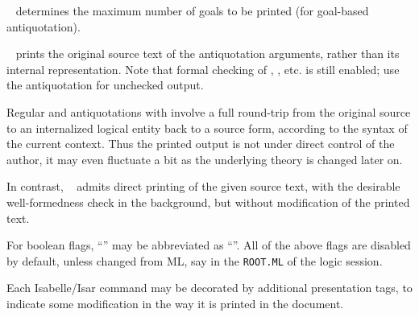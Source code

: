 \begin{isabellebody}
\begin{isamarkuptext}
\begin{description}
  \item {}\hypertarget{antiquotation option.goals-limit}{\hyperlink{antiquotation option.goals-limit}{\mbox{}}}~
  determines the maximum number of goals to be printed (for goal-based
  antiquotation).

  \item {}\hypertarget{antiquotation option.source}{\hyperlink{antiquotation option.source}{\mbox{}}}~ prints the
  original source text of the antiquotation arguments, rather than its
  internal representation.  Note that formal checking of
  \hyperlink{antiquotation.thm}{\mbox{}}, \hyperlink{antiquotation.term}{\mbox{}}, etc. is still
  enabled; use the \hyperlink{antiquotation.text}{\mbox{}} antiquotation for unchecked
  output.

  Regular  and  antiquotations with  involve a full round-trip from the original source
  to an internalized logical entity back to a source form, according
  to the syntax of the current context.  Thus the printed output is
  not under direct control of the author, it may even fluctuate a bit
  as the underlying theory is changed later on.

  In contrast, \hypertarget{antiquotation option.source}{\hyperlink{antiquotation option.source}{\mbox{}}}~
  admits direct printing of the given source text, with the desirable
  well-formedness check in the background, but without modification of
  the printed text.

  \end{description}

  For boolean flags, ``'' may be abbreviated as
  ``''.  All of the above flags are disabled by default,
  unless changed from ML, say in the \verb|ROOT.ML| of the
  logic session.%
\end{isamarkuptext}%
\isamarkuptrue%
%
\isamarkuptrue%
%
\begin{isamarkuptext}%
Each Isabelle/Isar command may be decorated by additional
  presentation tags, to indicate some modification in the way it is
  printed in the document.


\end{isamarkuptext}
\end{isabellebody}
